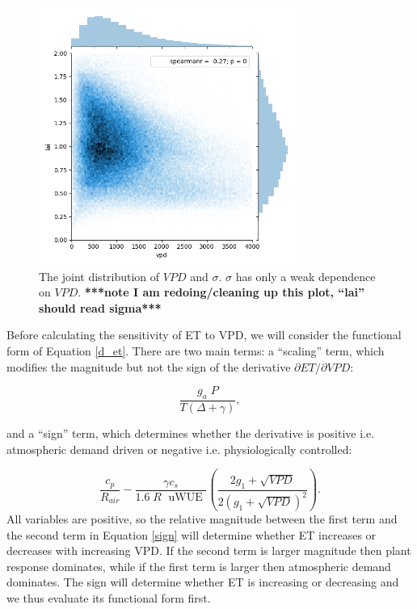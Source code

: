 \documentclass[draft,linenumbers]{agujournal}
\begin{document}
\begin{figure}[h]
\centering
\includegraphics[width=20pc]{./fig03.png}
\caption{The joint distribution of $VPD$ and $\sigma$. $\sigma$ has only a weak dependence on $VPD$. \textbf{***note I am redoing/cleaning up this plot, ``lai'' should read sigma***}}
\label{lai_vpd_fig}
\end{figure}

Before calculating the sensitivity of ET to VPD, we will consider the functional form of Equation \ref{d_et}. There are two main terms: a ``scaling'' term, which modifies the magnitude but not the sign of the derivative $\partial ET/\partial VPD$:

\begin{equation}
  \frac{g_a \; P}{T(\Delta + \gamma)},
\end{equation}

and a ``sign'' term, which determines whether the derivative is positive i.e. atmospheric demand driven or negative i.e. physiologically controlled:

\begin{equation}
  \label{sign}
  \frac{c_p}{R_{air}} - \frac{\gamma c_s }{1.6 \; R\; \text{ uWUE }} \left( \frac{2 g_1 + \sqrt{VPD}}{2 (g_1 + \sqrt{VPD})^2}\right).
\end{equation}
All variables are positive, so the relative magnitude between the first term and the second term in Equation \ref{sign} will determine whether ET increases or decreases with increasing VPD. If the second term is larger magnitude then plant response dominates, while if the first term is larger then atmospheric demand dominates. The sign will determine whether ET is increasing or decreasing and we thus evaluate its functional form first. 
\end{document}
